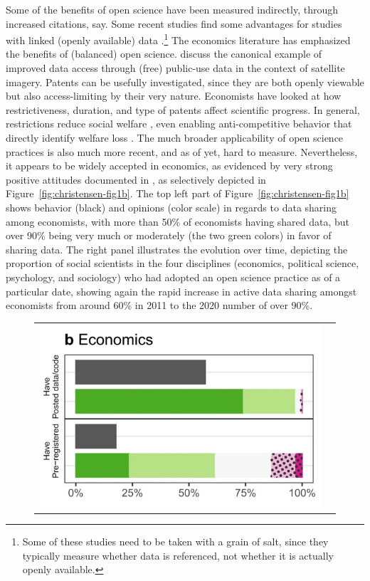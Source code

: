 \documentclass{Revue-economique}
\newcommand{\citep}{\parencite}
\newcommand{\citet}{\textcite}
\begin{document}
\begin{Article} [%
	Titre={Reproducibility and Open Science in Economics},
	Auteur={Lars Vilhuber\thanks{Cornell University, lars.vilhuber@cornell.edu}}]
\begin{refsection}[Main]
Some of the  benefits of open science have  been measured indirectly, through increased citations, say. Some recent studies find some advantages for studies with linked (openly available) data \citep{piwowar_data_2013,colavizza_citation_2020,christensen_study_2019}.\footnote{Some of these studies need to be taken with a grain of salt, since they typically measure whether data is referenced, not whether it is actually openly available.} The economics literature has emphasized the benefits of (balanced) open science. \citet{nagaraj_improving_2020} discuss the canonical example of improved data access through (free) public-use data in the context of satellite imagery. Patents can be usefully investigated, since they are both openly viewable but also access-limiting by their very nature. Economists have looked at how restrictiveness, duration, and type of patents affect scientific progress. In general, restrictions reduce social welfare \citep{williams_intellectual_2013,murray_mice_2016}, even enabling anti-competitive behavior that directly identify welfare loss \citep{xie_anticompetitive_2020}. The much broader applicability of open science practices is also much more recent, and as of yet, hard to measure. Nevertheless, it appears to be widely accepted in economics, as evidenced by very strong positive attitudes documented in \citet{ferguson_survey_2023}, as selectively depicted in  Figure~\ref{fig:christensen-fig1b}. The top left part of Figure~\ref{fig:christensen-fig1b} shows behavior (black) and opinions (color scale) in regards to data sharing among economists, with more than 50\% of economists having shared data, but over 90\% being very much or moderately (the two green colors) in favor of sharing data. The right panel illustrates the evolution over time, depicting the proportion of social scientists in the four disciplines (economics, political science, psychology, and sociology) who had adopted an open science practice as of a particular date, showing again the rapid increase in active data sharing amongst economists from around 60\% in 2011 to the 2020 number of over 90\%.  


\begin{figure}
    \centering
    \begin{tabular}{cc}
    \includegraphics[width=0.30\linewidth]{data/christensen-2019-fig1b.png}


\end{tabular}
\end{figure}
\end{refsection}
\end{Article}
\end{document}
